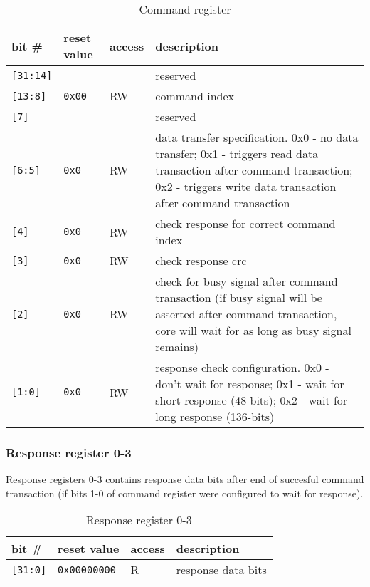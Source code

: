     \begin{table}[H]
    \caption{Command register}
        \begin{tabular}{m{1.3cm}|m{2cm}|m{1cm}|m{8cm}}
                \rowcolor[gray]{0.7} bit \# & reset value & access & description \\ \hline \hline
                \texttt{[31:14]} & &  & reserved \\ \hline
                \texttt{[13:8]} & \texttt{0x00} & RW & command index \\ \hline
                \texttt{[7]} & & & reserved \\ \hline
                \texttt{[6:5]} & \texttt{0x0} & RW & data transfer specification. 0x0 - no data transfer; 0x1 - triggers read data transaction after command transaction;
                0x2 - triggers write data transaction after command transaction\\ \hline
                \texttt{[4]} & \texttt{0x0} & RW & check response for correct command index \\ \hline
                \texttt{[3]} & \texttt{0x0} & RW & check response crc \\ \hline
                \texttt{[2]} & \texttt{0x0} & RW & check for busy signal after command transaction (if busy signal will be asserted after command transaction, 
                core will wait for as long as busy signal remains) \\ \hline
                \texttt{[1:0]} & \texttt{0x0} & RW & response check configuration. 0x0 - don't wait for response; 0x1 - wait for short response (48-bits);
                0x2 - wait for long response (136-bits) \\ \hline
                \hline
        \end{tabular}
        \label{tab:cmd_reg}
    \end{table}
    
    \subsubsection{Response register 0-3}
    \label{sec:resp_reg}
    
    Response registers 0-3 contains response data bits after end of succesful command transaction (if bits 1-0 of command register were configured to wait for response).
    
    \begin{table}[H]
    \caption{Response register 0-3}
        \begin{tabular}{m{1.3cm}|m{2cm}|m{1cm}|m{8cm}}
                \rowcolor[gray]{0.7} bit \# & reset value & access & description \\ \hline \hline
                \texttt{[31:0]} & \texttt{0x00000000} & R & response data bits \\ \hline
                \hline
        \end{tabular}
        \label{tab:resp_reg}
    \end{table}
    

